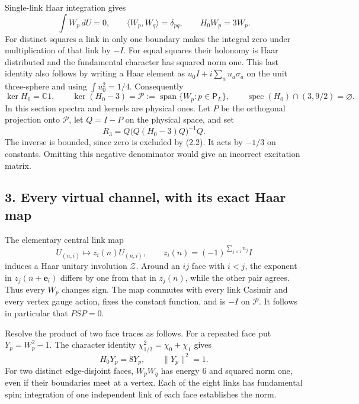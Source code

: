 \documentclass[
  11pt,
]{article}
\begin{document}
Single-link Haar integration gives \[
 \int W_p\,dU=0,\qquad \langle W_p,W_q\rangle=\delta_{pq},\qquad
 H_0W_p=3W_p.
\tag{2.1}
\] For distinct squares a link in only one boundary makes the integral
zero under multiplication of that link by \(-I\). For equal squares
their holonomy is Haar distributed and the fundamental character has
squared norm one. This last identity also follows by writing a Haar
element as \(u_0I+i\sum_au_a\sigma_a\) on the unit three-sphere and
using \(\int u_0^2=1/4\). Consequently \[
 \ker H_0=\mathbb C1,\qquad
 \ker(H_0-3)=\mathcal P:=\operatorname{span}\{W_p:p\in\mathsf P_L\},
 \qquad\operatorname{spec}(H_0)\cap(3,9/2)=\varnothing.
\tag{2.2}
\] In this section spectra and kernels are physical ones. Let \(P\) be
the orthogonal projection onto \(\mathcal P\), let \(Q=I-P\) on the
physical space, and set \[
 R_3=Q\bigl(Q(H_0-3)Q\bigr)^{-1}Q.
\tag{2.3}
\] The inverse is bounded, since zero is excluded by (2.2). It acts by
\(-1/3\) on constants. Omitting this negative denominator would give an
incorrect excitation matrix.

\subsection{3. Every virtual channel, with its exact Haar
map}\label{magnetic-part-5-every-virtual-channel-with-its-exact-haar-map}

The elementary central link map \[
 U_{(n,i)}\longmapsto z_i(n)U_{(n,i)},\qquad
 z_i(n)=(-1)^{\sum_{j<i}n_j}I
\tag{3.1}
\] induces a Haar unitary involution \(\mathcal Z\). Around an \(ij\)
face with \(i<j\), the exponent in \(z_j(n+\mathbf e_i)\) differs by one
from that in \(z_j(n)\), while the other pair agrees. Thus every \(W_p\)
changes sign. The map commutes with every link Casimir and every vertex
gauge action, fixes the constant function, and is \(-I\) on
\(\mathcal P\). It follows in particular that \(PSP=0\).

Resolve the product of two face traces as follows. For a repeated face
put \(Y_p=W_p^2-1\). The character identity
\(\chi_{1/2}^2=\chi_0+\chi_1\) gives \[
 H_0Y_p=8Y_p,\qquad\|Y_p\|^2=1.
\tag{3.2}
\] For two distinct edge-disjoint faces, \(W_pW_q\) has energy \(6\) and
squared norm one, even if their boundaries meet at a vertex. Each of the
eight links has fundamental spin; integration of one independent link of
each face establishes the norm.
\end{document}
